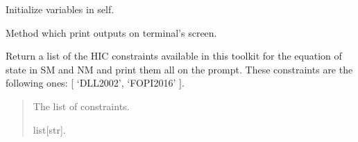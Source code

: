 \documentclass[letterpaper,10pt,english]{sphinxmanual}
\begin{document}
\begin{fulllineitems}
\begin{fulllineitems}
\label{\detokenize{source/api/setup_hic_matter:nucleardatapy.setup_hic_matter.SetupHICMatter.init_self}}
\pysigstartsignatures
\pysiglinewithargsret
{}
{}
{}
\pysigstopsignatures
\sphinxAtStartPar
Initialize variables in self.

\end{fulllineitems}


\begin{fulllineitems}
\label{\detokenize{source/api/setup_hic_matter:nucleardatapy.setup_hic_matter.SetupHICMatter.print_outputs}}
\pysigstartsignatures
\pysiglinewithargsret
{}
{}
{}
\pysigstopsignatures
\sphinxAtStartPar
Method which print outputs on terminal’s screen.

\end{fulllineitems}


\end{fulllineitems}


\begin{fulllineitems}
\label{\detokenize{source/api/setup_hic_matter:nucleardatapy.setup_hic_matter.constraints_HIC_matter}}
\pysigstartsignatures
\pysiglinewithargsret
{}
{}
{}
\pysigstopsignatures
\sphinxAtStartPar
Return a list of the HIC constraints available in this toolkit
for the equation of state in SM and NM and print them all on
the prompt. These constraints are the following
ones: {[} ‘DLL\sphinxhyphen{}2002’, ‘FOPI\sphinxhyphen{}2016’ {]}.
\begin{quote}\begin{description}
\sphinxAtStartPar
The list of constraints.

\sphinxAtStartPar
list{[}str{]}.

\end{description}\end{quote}

\end{fulllineitems}
\end{document}
